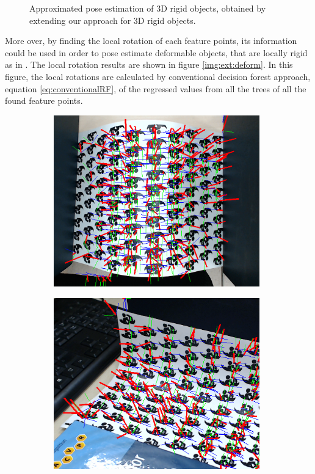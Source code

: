 \documentclass[annual]{acmsiggraph}
\begin{document}
\begin{figure}[h]
\caption{Approximated pose estimation of 3D rigid objects, obtained by extending our approach for 3D rigid objects.}
\label{img:ext:3d}
\end{figure}

More over, by finding the local rotation of each feature points, its information could be used in order to pose estimate deformable objects, that are locally rigid as in \cite{Tokunaga:2015}. The local rotation results are shown in figure \ref{img:ext:deform}. In this figure, the local rotations are calculated by conventional decision forest approach, equation \eqref{eq:conventionalRF}, of the regressed values from all the trees of all the found feature points.  

\begin{figure}[h]
\center
\begin{subfigure}[c]{0.49\columnwidth} \includegraphics[width=0.98\textwidth]{images/deform_local_result_1.png} \end{subfigure}%
\begin{subfigure}[c]{0.49\columnwidth} \includegraphics[width=0.98\textwidth]{images/deform_local_result_2.png} \end{subfigure}%

\end{figure}
\end{document}
